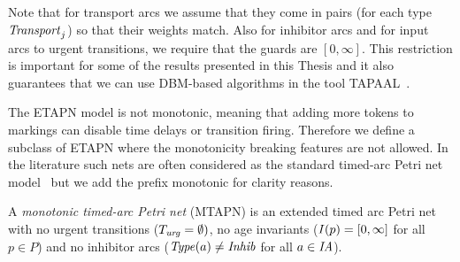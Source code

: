 \begin{remark}
Note that for transport arcs we assume that they come in pairs (for
each type $\mathit{Transport}_j$) so that their weights match.
Also for inhibitor arcs and for input arcs to urgent transitions, we
require that the guards are $[0,\infty]$. This restriction is important
for some of the results presented in this Thesis and it also guarantees that 
we can use DBM-based algorithms in the tool TAPAAL~\cite{DJJJMS:TACAS:12}.
\end{remark}

The ETAPN model is not monotonic, meaning
that adding more tokens to markings can disable time delays or
transition firing.
Therefore we define a subclass of 
ETAPN where the monotonicity breaking features are not allowed.
In the literature such nets are often considered as the standard
timed-arc Petri net model~\cite{BLT:90,Hanisch:93} but we add the 
prefix monotonic for clarity reasons. 

\begin{definition} \label{deftapn}
A \emph{monotonic timed-arc Petri net} 
(MTAPN) is an extended timed arc Petri net 
with no urgent transitions ($T_{\mathit{urg}}=\emptyset)$, no age invariants
($\mathit{I}(p) = [0,\infty]$ for all $p \in P$) and no 
inhibitor arcs ($\mathit{Type}(a) \not= \mathit{Inhib}$ for all $a \in \mathit{IA}$).
\end{definition}



